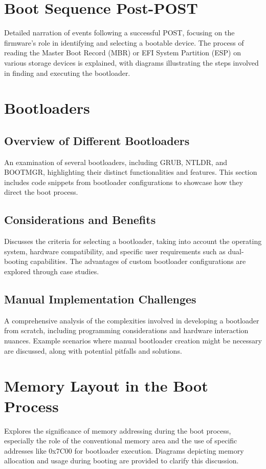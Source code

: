 \documentclass[12pt]{article}
\begin{document}
\section{Boot Sequence Post-POST}
Detailed narration of events following a successful POST, focusing on the firmware's role in identifying and selecting a bootable device. The process of reading the Master Boot Record (MBR) or EFI System Partition (ESP) on various storage devices is explained, with diagrams illustrating the steps involved in finding and executing the bootloader.

\section{Bootloaders}
\subsection{Overview of Different Bootloaders}
An examination of several bootloaders, including GRUB, NTLDR, and BOOTMGR, highlighting their distinct functionalities and features. This section includes code snippets from bootloader configurations to showcase how they direct the boot process.

\subsection{Considerations and Benefits}
Discusses the criteria for selecting a bootloader, taking into account the operating system, hardware compatibility, and specific user requirements such as dual-booting capabilities. The advantages of custom bootloader configurations are explored through case studies.

\subsection{Manual Implementation Challenges}
A comprehensive analysis of the complexities involved in developing a bootloader from scratch, including programming considerations and hardware interaction nuances. Example scenarios where manual bootloader creation might be necessary are discussed, along with potential pitfalls and solutions.

\section{Memory Layout in the Boot Process}
Explores the significance of memory addressing during the boot process, especially the role of the conventional memory area and the use of specific addresses like 0x7C00 for bootloader execution. Diagrams depicting memory allocation and usage during booting are provided to clarify this discussion.
\end{document}
